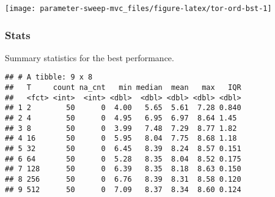 \documentclass[]{book}
\newenvironment{Shaded}{\begin{snugshade}}{\end{snugshade}}
\newcommand{\DataTypeTok}[1]{\textcolor[rgb]{0.13,0.29,0.53}{#1}}
\newcommand{\KeywordTok}[1]{\textcolor[rgb]{0.13,0.29,0.53}{\textbf{#1}}}
\newcommand{\NormalTok}[1]{#1}
\newcommand{\OperatorTok}[1]{\textcolor[rgb]{0.81,0.36,0.00}{\textbf{#1}}}
\newcommand{\OtherTok}[1]{\textcolor[rgb]{0.56,0.35,0.01}{#1}}
\newcommand{\StringTok}[1]{\textcolor[rgb]{0.31,0.60,0.02}{#1}}
\begin{document}
\texttt{[image: parameter-sweep-mvc\_files/figure-latex/tor-ord-bst-1]}

\hypertarget{stats-12}{%
\subsubsection{Stats}\label{stats-12}}

Summary statistics for the best performance.

\begin{Shaded}
\end{Shaded}

\begin{verbatim}
## # A tibble: 9 x 8
##   T     count na_cnt   min median  mean   max   IQR
##   <fct> <int>  <int> <dbl>  <dbl> <dbl> <dbl> <dbl>
## 1 2        50      0  4.00   5.65  5.61  7.28 0.840
## 2 4        50      0  4.95   6.95  6.97  8.64 1.45 
## 3 8        50      0  3.99   7.48  7.29  8.77 1.82 
## 4 16       50      0  5.95   8.04  7.75  8.68 1.18 
## 5 32       50      0  6.45   8.39  8.24  8.57 0.151
## 6 64       50      0  5.28   8.35  8.04  8.52 0.175
## 7 128      50      0  6.39   8.35  8.18  8.63 0.150
## 8 256      50      0  6.76   8.39  8.31  8.58 0.120
## 9 512      50      0  7.09   8.37  8.34  8.60 0.124
\end{verbatim}
\end{document}
